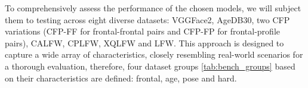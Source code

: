 \documentclass[class=report, crop=false, a4paper, 12pt]{standalone}
\begin{document}
\par To comprehensively assess the performance of the chosen models, we will subject them to testing across eight diverse datasets: VGGFace2, AgeDB30, two CFP variations (CFP-FF for frontal-frontal pairs and CFP-FP for frontal-profile pairs), CALFW, CPLFW, XQLFW and LFW. This approach is designed to capture a wide array of characteristics, closely resembling real-world scenarios for a thorough evaluation, therefore, four dataset groups \autoref{tab:bench_groups} based on their characteristics are defined: frontal, age, pose and hard. 


\begin{table}[H]
  \centering
  \caption{Benchmarks' groups, their difficulty and intended evaluation purpose. * - Very easy. ***** - Very difficult.}
  \label{tab:bench_groups}
\end{table}
\end{document}
